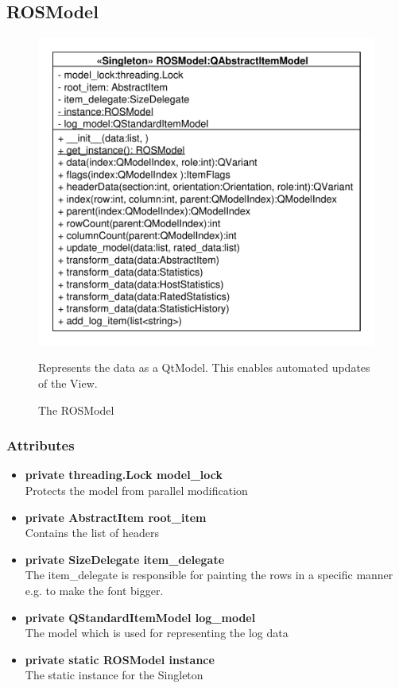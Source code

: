 \subsection{ROSModel}
\begin{figure}[htbp]
	\begin{minipage}[t]{7cm}
		\vspace{0pt}
		\centering
		\includegraphics[scale=0.6]{./diagram_pictures/ROSModel.pdf}
		\caption{The ROSModel}
	\end{minipage}
	\hfill
	\begin{minipage}[t]{6cm}
		\vspace{10pt}		
		Represents the data as a QtModel. This enables automated updates of the View.
	\end{minipage}
\end{figure}
\subsubsection{Attributes}
\begin{itemize}
  \item \textbf{private threading.Lock model\_lock}\\ 
  Protects the model from parallel modification
  \item \textbf{private AbstractItem root\_item}\\
  Contains the list of headers
  \item \textbf{private SizeDelegate item\_delegate}\\
  The item\_delegate is responsible for painting the rows in a specific manner e.g. to make the font bigger.
  \item \textbf{private QStandardItemModel log\_model}\\ The model which is used for representing the log data
  \item \textbf{private static ROSModel instance}\\
   The static instance for the Singleton
   
\end{itemize}
